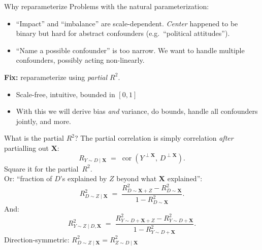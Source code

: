 \documentclass[xcolor=dvipsnames]{beamer}
\newcommand\X{{\bm X}}
\DeclareMathOperator{\cor}{cor}
\begin{document}
\begin{frame}{Why reparameterize}
\small
{} Problems with the natural parameterization:
\begin{itemize}
\item<2-> ``Impact'' and ``imbalance'' are scale-dependent. \textit{Center} happened to be binary but hard for abstract confounders (e.g.\ ``political attitudes'').
\item<3-> ``Name a possible confounder'' is too narrow. We want to handle multiple confounders, possibly acting non-linearly.
\end{itemize}
\medskip
{} \textbf{Fix:} reparameterize using \textit{partial $R^2$}.
\begin{itemize}
\item<5-> Scale-free, intuitive, bounded in $[0,1]$
\item<6-> With this we will derive bias \textit{and} variance, do bounds, handle all confounders jointly, and more.
\end{itemize}
\end{frame}


\begin{frame}{What is the partial $R^2$?}
\small
{} The partial correlation is simply correlation \textit{after} partialling out $\X$:
\[
R_{Y \sim D \mid \X} \;=\; \cor(Y^{\perp \X},\, D^{\perp \X}).
\]
Square it for the partial~$R^2$.\\

\medskip
{} Or: ``fraction of $D$'s explained by $Z$ beyond what $\X$ explained'':   
\[
R^2_{D\sim Z \mid \X} \;=\; \frac{R^2_{D\sim \X + Z} - R^2_{D\sim \X}}{1 - R^2_{D\sim \X}}.
\]
 And:
\[
R^2_{Y\sim Z \mid D, \X} \;=\; \frac{R^2_{Y\sim D + \X + Z} - R^2_{Y\sim D + \X}}{1 - R^2_{Y\sim D + \X}}.
\]
 Direction-symmetric: $R^2_{D\sim Z \mid \X} = R^2_{Z \sim D \mid \X}$ 
\end{frame}
\end{document}
